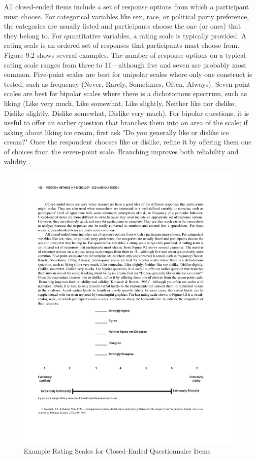 All closed-ended items include a set of response options from which a participant must choose. For categorical variables like sex, race, or political party preference, the categories are usually listed and participants choose the one (or ones) that they belong to. For quantitative variables, a rating scale is typically provided. A rating scale is an ordered set of responses that participants must choose from. Figure 9.2 shows several examples. The number of response options on a typical rating scale ranges from three to 11---although five and seven are probably most common. Five-point scales are best for unipolar scales where only one construct is tested, such as frequency (Never, Rarely, Sometimes, Often, Always). Seven-point scales are best for bipolar scales where there is a dichotomous spectrum, such as liking (Like very much, Like somewhat, Like slightly, Neither like nor dislike, Dislike slightly, Dislike somewhat, Dislike very much). For bipolar questions, it is useful to offer an earlier question that branches them into an area of the scale; if asking about liking ice cream, first ask "Do you generally like or dislike ice cream?" Once the respondent chooses like or dislike, refine it by offering them one of choices from the seven-point scale. Branching improves both reliability and validity \citep{krosnick_comparisons_1993}. 


\begin{figure}


\includegraphics[width=.7\linewidth]{figures/C9scales.pdf}


\caption{Example Rating Scales for Closed-Ended Questionnaire Items}


\label{fig:scales}


\end{figure}


